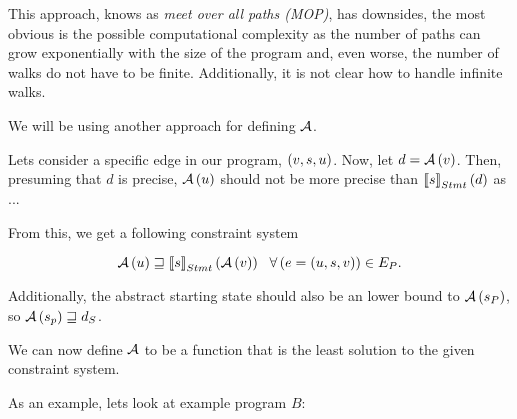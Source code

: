 \documentclass[..thesis.tex]{subfiles}
\begin{document}

This approach, knows as \textit{meet over all  paths (MOP)}, has downsides, the most obvious is the possible computational complexity as the number of paths can grow exponentially with the size of the program and, even worse, the number of walks do not have to be finite. Additionally, it is not clear how to handle infinite walks. 

We will be using another approach for defining $\mathcal{A}$.


Lets consider a specific edge in our program, $\left( v, s, u \right)$. Now, let $d = \mathcal{A} \left( v \right)$. Then, presuming that $d$ is precise, $\mathcal{A} \left( u \right) $ should not be more precise than $\left\llbracket s \right\rrbracket_{Stmt} \left( d \right)$ as ...

  
From this, we get a following constraint system

\begin{equation}
\label{constraints}
\mathcal{A} \left(  u \right) \sqsupseteq \left\llbracket s \right\rrbracket_{Stmt} \left( \mathcal{A} \left( v \right) \right) ~~ \forall \left( e = \left( u, s, v \right) \right) \in E_P \text{.}
\end{equation}

Additionally, the abstract starting state should also be an lower bound to $\mathcal{A} \left( s_P \right)$, so $\mathcal{A} \left( s_p \right) \sqsupseteq d_S$. 

We can now define $\mathcal{A}$ to be a function that is the least solution to the given constraint system.


As an example, lets look at example program $B$: 
\end{document}
